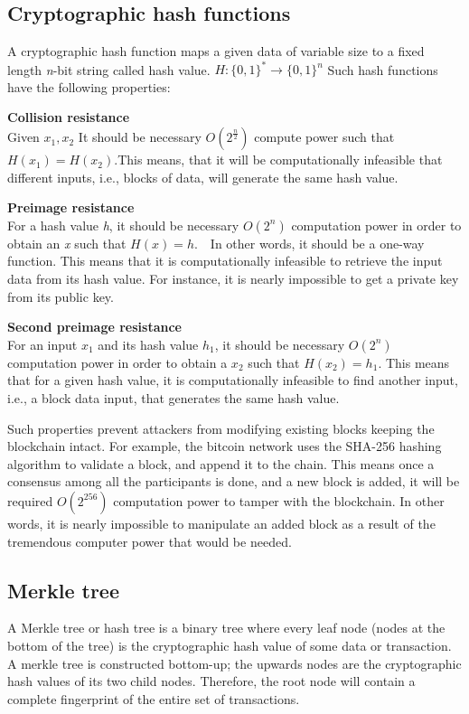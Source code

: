 \documentclass[11pt,a4paper]{report}
\begin{document}
\subsection{Cryptographic hash functions}\label{sec:chf}
A cryptographic hash function\cite{chf}\cite{book:chf} maps a given data of variable size to a fixed length \emph{n}-bit string called hash value. $ H : \{0,1\}^* \to \{0,1\}^n $ Such hash functions have the following properties:
\begin{description}		
	\item \textbf{Collision resistance}\\ Given $x_1, x_2 $ It should be necessary $ O(2^\frac{n}{2}) $ compute power such that $H(x_1) = H(x_2).$This means, that it will be computationally infeasible that different inputs, i.e., blocks of data, will generate the same hash value.	
	\item \textbf{Preimage resistance}\\ For a hash value \emph{h}, it should be necessary $ O(2^n) $ computation power in order to obtain an \emph{x} such that $ H(x)=h $.~~In other words, it should be a one-way function. 
	This means that it is computationally infeasible to retrieve the input data from its hash value. For instance, it is nearly impossible to get a private key from its public key.	
	\item \textbf{Second preimage resistance}\\ For an input $x_1$ and its hash value $h_1$, it should be necessary $ O(2^n) $ computation power in order to obtain a $x_2$ such that $H(x_2)=h_1.$ This means that for a given hash value, it is computationally infeasible to find another input, i.e., a block data input, that generates the same hash value. 	
\end{description}

Such properties prevent attackers from modifying existing blocks keeping the blockchain intact. For example, the bitcoin network uses the SHA-256 hashing algorithm to validate a block, and append it to the chain. This means once a consensus among all the participants is done, and a new block is added, it will be required $ O(2^{256}) $ computation power to tamper with the blockchain. In other words, it is nearly impossible to manipulate an added block as a result of the tremendous computer power that would be needed.

\subsection{Merkle tree}\label{sec:mt}
A Merkle tree\cite{article:merkle}\cite{book:merkle} or hash tree is a binary tree where every leaf node (nodes at the bottom of the tree) is the cryptographic hash value of some data or transaction. A merkle tree is constructed bottom-up; the upwards nodes are the cryptographic hash values of its two child nodes. Therefore, the root node  will contain a complete fingerprint of the entire set of transactions. 
\end{document}
